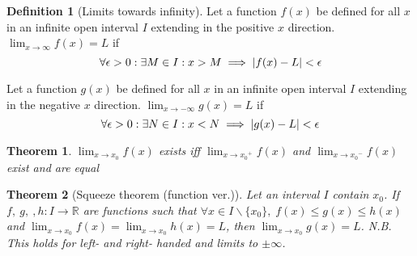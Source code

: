 \documentclass{article}
\theoremstyle{plain}
\newtheorem{theorem}{Theorem}[section]
\numberwithin{theorem}{section}
\theoremstyle{definition}
\newtheorem{definition}{Definition}[section]
\numberwithin{definition}{section}
\newcommand*{\R}{\mathbb{R}}
\begin{document}
%
\begin{definition}[Limits towards infinity]
    Let a function $f(x)$ be defined for all $x$ in an infinite open interval $I$
    extending in the positive $x$ direction.
    $\displaystyle \lim_{x\to\infty} f(x) = L$ if
    \[ \forall \epsilon>0: \exists M \in I: x>M
        \implies \abs{f(x)-L}<\epsilon \]

    Let a function $g(x)$ be defined for all $x$ in an infinite open interval $I$
    extending in the negative $x$ direction.
    $\displaystyle \lim_{x\to-\infty} g(x) = L$ if
    \[ \forall \epsilon>0: \exists N \in I: x<N
        \implies \abs{g(x)-L}<\epsilon \]
\end{definition}
%
\begin{theorem}
    $\displaystyle\lim_{x\to x_0} f(x)$ exists iff
    $\displaystyle\lim_{x\to {x_0}^+} f(x)$ and $\displaystyle\lim_{x\to {x_0}^-} f(x)$
    exist and are equal
\end{theorem}
%
\begin{theorem}[Squeeze theorem (function ver.)]
    Let an interval $I$ contain $x_0$.
    If $f,\:g,\:,h : I \to \R$ are functions such that
    $\forall x \in I\backslash\{x_0\},\; f(x)\le g(x)\le h(x)$
    and
    $\displaystyle\lim_{x\to x_0} f(x) = \lim_{x\to x_0} h(x) = L$,
    then
    $\displaystyle\lim_{x\to x_0} g(x) = L$.
    N.B. This holds for left- and right- handed and limits to $\pm\infty$.
\end{theorem}
\end{document}
